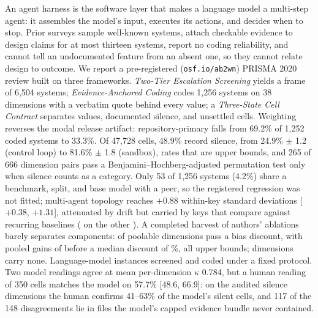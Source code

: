An agent harness is the software layer that makes a language model a multi-step agent: it
assembles the model's input, executes its actions, and decides when to stop.
Prior surveys sample well-known systems, attach checkable evidence to design claims for at most
thirteen systems, report no coding reliability, and cannot tell an undocumented feature from an absent one, so they cannot relate design
to outcome. We report a pre-registered (\texttt{osf.io/ab2wn}) PRISMA 2020 review built on three
frameworks. \emph{Two-Tier Escalation Screening} yields a frame of 6,504 systems;
\emph{Evidence-Anchored Coding} codes 1,256 systems on 38 dimensions with a verbatim quote behind
every value; a \emph{Three-State Cell Contract} separates values, documented silence, and unsettled
cells. Weighting reverses the modal release artifact: repository-primary falls from 69.2\% of
1,252 coded systems to 33.3\%. Of 47,728 cells, 48.9\% record silence, from
24.9\% $\pm$ 1.2 (control loop) to 81.6\% $\pm$ 1.8 (sandbox), rates that are upper bounds, and 265 of 666 dimension pairs pass a
Benjamini--Hochberg-adjusted permutation test only when silence counts as a category. Only 53 of 1,256 systems (4.2\%) share a
benchmark, split, and base model with a peer, so the registered regression was not fitted;
multi-agent topology reaches $+0.88$ within-key standard deviations [$+0.38$, $+1.31$], attenuated by
drift but carried by keys that compare against recurring baselines (\rqXPOtherEffect{} \rqXPOtherCI{} on the
other \rqXPOtherKeys{}). A completed harvest of authors' ablations barely separates components: \rqDiscountSurviveZ{} of
\rqPoolableDims{} poolable dimensions pass a bias discount, with pooled gains of \rqEffectRangeSurviving{}
before a median discount of \rqMedianDiscountPct\%, all upper bounds; \rqZeroDimCount{} dimensions carry none.
Language-model instances screened and coded under a fixed protocol. Two model readings agree at mean
per-dimension $\kappa$ 0.784, but a human reading of 350 cells matches the model on 57.7\% [48.6, 66.9]:
on the audited silence dimensions the human confirms 41--63\% of the model's silent cells, and 117 of
the 148 disagreements lie in files the model's capped evidence bundle never contained.
